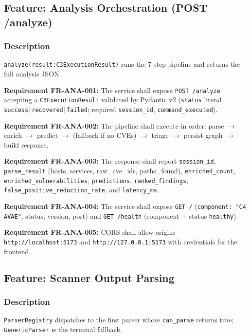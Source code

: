 \documentclass[10pt,journal,onecolumn]{IEEEtran}
\newcommand{\reqid}[1]{\textbf{#1}}
\begin{document}
\subsection{Feature: Analysis Orchestration (POST /analyze)}

\subsubsection{Description}

\texttt{analyze(result:\allowbreak  C3ExecutionResult)} runs the 7-step pipeline and returns the full analysis JSON.

\reqid{Requirement FR-ANA-001:} The service shall expose \texttt{POST /analyze} accepting a \texttt{C3ExecutionResult} validated by Pydantic v2 (\texttt{status} literal \texttt{success|recovered|failed}; required \texttt{session\_id}, \texttt{command\_executed}).

\reqid{Requirement FR-ANA-002:} The pipeline shall execute in order: parse $\rightarrow$ enrich $\rightarrow$ predict $\rightarrow$ (fallback if no CVEs) $\rightarrow$ triage $\rightarrow$ persist graph $\rightarrow$ build response.

\reqid{Requirement FR-ANA-003:} The response shall report \texttt{session\_id}, \texttt{parse\_result} (hosts, services, raw\_cve\_ids, paths\_found), \texttt{enriched\_count}, \texttt{enriched\_\allowbreak vulnerabilities}, \texttt{predictions}, \texttt{ranked\_findings}, \texttt{false\_\allowbreak positive\_\allowbreak reduction\_\allowbreak rate}, and \texttt{latency\_ms}.

\reqid{Requirement FR-ANA-004:} The service shall expose \texttt{GET /} (\texttt{component: "C4 AVAE"}, status, version, port) and \texttt{GET /health} (component + status \texttt{healthy}).

\reqid{Requirement FR-ANA-005:} CORS shall allow origins \texttt{http://localhost:5173} and \texttt{http://127.0.0.1:5173} with credentials for the frontend.

\subsection{Feature: Scanner Output Parsing}

\subsubsection{Description}

\texttt{ParserRegistry} dispatches to the first parser whose \texttt{can\_parse} returns true; \texttt{GenericParser} is the terminal fallback.
\end{document}
